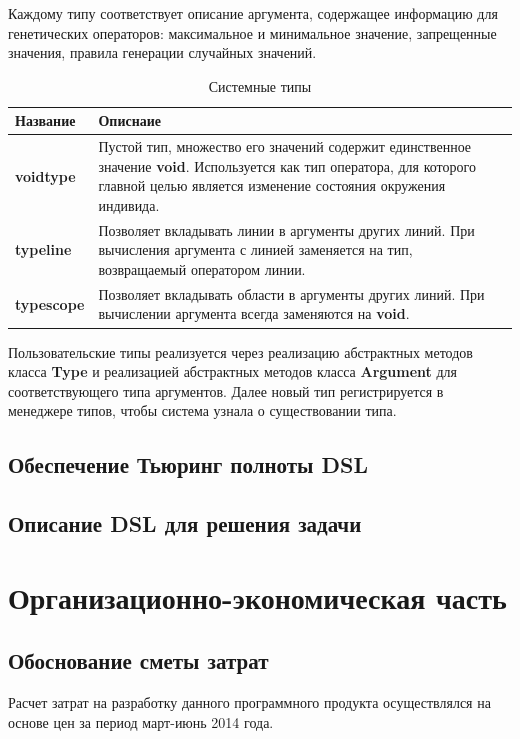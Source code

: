 \documentclass[russian,utf8,emptystyle]{eskdtext}
\begin{document}
\begin{spacing}{1.5}
Каждому типу соответствует описание аргумента, содержащее информацию для генетических операторов: максимальное и минимальное значение, запрещенные значения, правила генерации случайных значений.

\begin{table}
\centering
\caption{Системные типы}
\label{tab:system_types}
\begin{tabularx}{\textwidth}{X|X}
Название & Описнаие \\ 
\hline 
\textbf{voidtype} & Пустой тип, множество его значений содержит единственное значение \textbf{void}. Используется как тип оператора, для которого главной целью является изменение состояния окружения индивида. \\ \hline
\textbf{typeline} & Позволяет вкладывать линии в аргументы других линий. При вычисления аргумента с линией заменяется на тип, возвращаемый оператором линии. \\ \hline
\textbf{typescope} & Позволяет вкладывать области в аргументы других линий. При вычислении аргумента всегда заменяются на \textbf{void}. 
\end{tabularx} 
\end{table}

Пользовательские типы реализуется через реализацию абстрактных методов класса \textbf{Type} и реализацией абстрактных методов класса \textbf{Argument} для соответствующего типа аргументов. Далее новый тип регистрируется в менеджере типов, чтобы система узнала о существовании типа.

\subsection{Обеспечение Тьюринг полноты DSL}

\subsection{Описание DSL для решения задачи}

\newpage
\section{Организационно-экономическая часть}
\subsection{Обоснование сметы затрат}
Расчет затрат на разработку данного программного продукта осуществлялся на основе цен за период март-июнь 2014 года.

\end{spacing}
\end{document}
